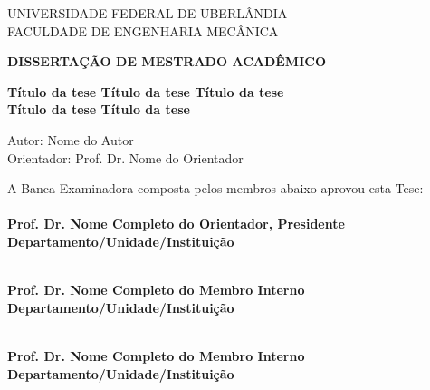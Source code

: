 \clearpage
\begin{center}
	
	{UNIVERSIDADE FEDERAL DE UBERLÂNDIA\\\vspace{1.2ex}}
	{FACULDADE DE ENGENHARIA MECÂNICA\\\vspace{1.2ex}}

	
	\vspace{1.5cm}
	\textbf{DISSERTAÇÃO DE MESTRADO ACADÊMICO}
	
	\vspace{1.4cm}
	{\fontsize{23}{23} \textbf{Título da tese Título da tese Título da tese}}\\ \vspace{1.2ex}
	{\fontsize{23}{23} \textbf{Título da tese Título da tese}}\\ \vspace{1.2ex}
	\vspace{0.8cm}
	\begin{flushleft}
		\vspace{0.2cm}
		Autor: Nome do Autor\\
		\vspace{0.2cm}
		Orientador: Prof. Dr. Nome do Orientador
		
		\vspace{0.4cm}
		A Banca Examinadora composta pelos membros abaixo aprovou esta Tese:\\
		\vspace{0.5cm}
		\hrulefill\\
		\textbf{Prof. Dr. Nome Completo do Orientador, Presidente\\
			Departamento/Unidade/Instituição \\}
		
		\vspace{0.5cm}
		\hrulefill\\
		\textbf{Prof. Dr. Nome Completo do Membro Interno \\
			Departamento/Unidade/Instituição \\}
		
		\vspace{0.5cm}
		\hrulefill\\
		\textbf{Prof. Dr. Nome Completo do Membro Interno \\
			Departamento/Unidade/Instituição \\}
		\vspace{0.5cm}
		

\end{flushleft}
\end{center}

